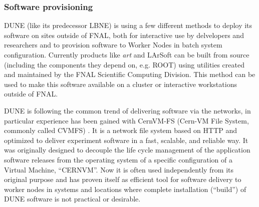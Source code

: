 \subsubsection{Software provisioning}
DUNE (like its predecessor LBNE) is using a few different methods to deploy its software on sites outside of FNAL,
both for interactive use by delvelopers and researchers and to provision software to  Worker Nodes
in batch system configuration. Currently products like \textit{art} and LArSoft can be built from source (including
the components they depend on, e.g. ROOT) using utilities created and maintained by the FNAL Scientific Computing
Division. This method can be used to make this software available on a cluster or interactive workstations outside
of FNAL.

DUNE is following the common trend of delivering software via the networks, in particular experience has been gained with
CernVM-FS (Cern-VM File System, commonly called CVMFS) \cite{cvmfs}. It is a network file system based on HTTP and
optimized to deliver experiment software in a fast, scalable,
and reliable way. It was originally designed to decouple the life cycle management of the application software releases
from the operating system of a specific configuration of a Virtual Machine, ``CERNVM''. Now it is often used independently
from its original purpose and has proven itself as efficient tool for software delivery to worker nodes in systems and locations
where complete installation (``build'') of DUNE software is not practical or desirable.